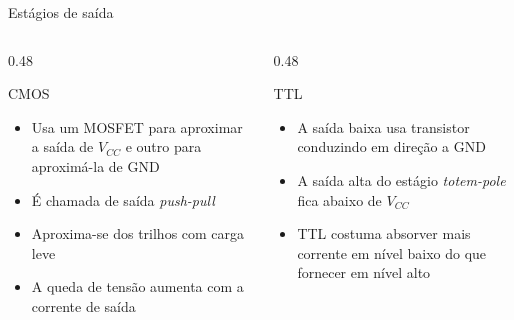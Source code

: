 \begin{frame}{Estágios de saída}
    \begin{columns}[T]
        \begin{column}{0.48\textwidth}
            \begin{block}{CMOS}
                \begin{itemize}
                    \item Usa um MOSFET para aproximar a saída de $V_{CC}$ e
                          outro para aproximá-la de GND
                    \item É chamada de saída \textit{push-pull}
                    \item Aproxima-se dos trilhos com carga leve
                    \item A queda de tensão aumenta com a corrente de saída
                \end{itemize}
            \end{block}
        \end{column}
        \begin{column}{0.48\textwidth}
            \begin{alertblock}{TTL}
                \begin{itemize}
                    \item A saída baixa usa transistor conduzindo em direção a GND
                    \item A saída alta do estágio \textit{totem-pole} fica abaixo
                          de $V_{CC}$
                    \item TTL costuma absorver mais corrente em nível baixo do
                          que fornecer em nível alto
                \end{itemize}
            \end{alertblock}
        \end{column}
    \end{columns}
\end{frame}
